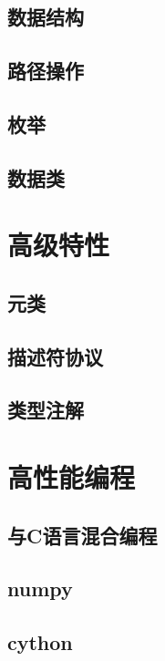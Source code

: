 \documentclass{ctexbook}
\begin{document}
	\chapter{数据结构}
	\chapter{路径操作}
	\chapter{枚举}
	\chapter{数据类}


\part{高级特性}
	\chapter{元类}
	\chapter{描述符协议}
	\chapter{类型注解}


\part{高性能编程}
\chapter{与C语言混合编程}
\chapter{numpy}
\chapter{cython}
\end{document}

